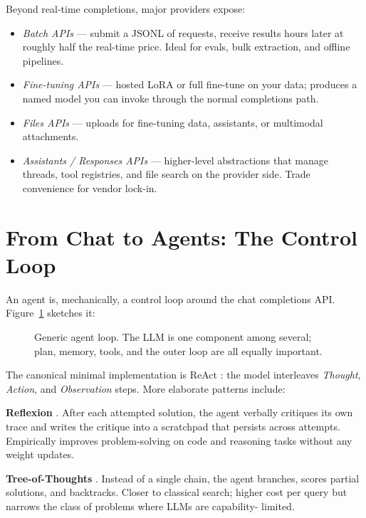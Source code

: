 Beyond real-time completions, major providers expose:
\begin{itemize}
  \item \emph{Batch APIs} --- submit a JSONL of requests, receive
        results hours later at roughly half the real-time price.
        Ideal for evals, bulk extraction, and offline pipelines.
  \item \emph{Fine-tuning APIs} --- hosted LoRA or full fine-tune
        on your data; produces a named model you can invoke
        through the normal completions path.
  \item \emph{Files APIs} --- uploads for fine-tuning data,
        assistants, or multimodal attachments.
  \item \emph{Assistants / Responses APIs} --- higher-level
        abstractions that manage threads, tool registries, and
        file search on the provider side. Trade convenience for
        vendor lock-in.
\end{itemize}

\section{From Chat to Agents: The Control Loop}

An agent is, mechanically, a control loop around the chat
completions API. Figure~\ref{fig:agent_loop} sketches it:

\begin{figure}[H]
  \centering
  
  \caption{Generic agent loop. The LLM is one component among
           several; plan, memory, tools, and the outer loop are
           all equally important.}
  \label{fig:agent_loop}
\end{figure}

The canonical minimal implementation is ReAct
\citep{yao2023react}: the model interleaves \emph{Thought},
\emph{Action}, and \emph{Observation} steps. More elaborate
patterns include:

\textbf{Reflexion} \citep{shinn2023reflexion}. After each
attempted solution, the agent verbally critiques its own trace
and writes the critique into a scratchpad that persists across
attempts. Empirically improves problem-solving on code and
reasoning tasks without any weight updates.

\textbf{Tree-of-Thoughts} \citep{yao2023tree}. Instead of a
single chain, the agent branches, scores partial solutions, and
backtracks. Closer to classical search; higher cost per query
but narrows the class of problems where LLMs are capability-
limited.

